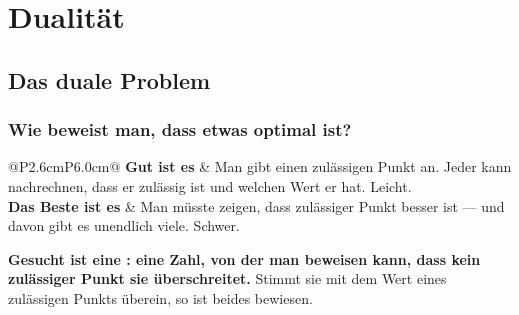 \part{Dualität}

\chapter{Das duale Problem}

\section{Wie beweist man, dass etwas optimal ist?}

\begin{merksatz}
\begin{center}
{\small
\renewcommand{\arraystretch}{1.5}
\begin{tabular}{@{}P{2.6cm}P{6.0cm}@{}}
\toprule
\textbf{Gut ist es} & Man gibt einen zulässigen Punkt an. Jeder kann nachrechnen, dass er zulässig ist und welchen Wert er hat. \textcolor{gruen}{Leicht.}\\
\textbf{Das Beste ist es} & Man müsste zeigen, dass  zulässiger Punkt besser ist --- und davon gibt es unendlich viele. \textcolor{akzent}{Schwer.}\\
\bottomrule
\end{tabular}}
\end{center}

\begin{center}
\begin{minipage}{0.9\textwidth}
\textbf{Gesucht ist eine : eine Zahl, von der man beweisen kann, dass kein zulässiger Punkt sie überschreitet.} Stimmt sie mit dem Wert eines zulässigen Punkts überein, so ist beides bewiesen.
\end{minipage}
\end{center}
\end{merksatz}

